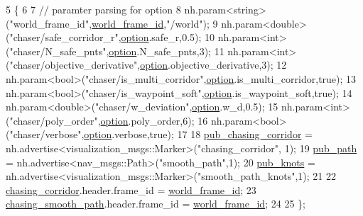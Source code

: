 \begin{DoxyCode}
5                                         \{
6 
7     \textcolor{comment}{// paramter parsing for option }
8     nh.param<\textcolor{keywordtype}{string}>(\textcolor{stringliteral}{"world\_frame\_id"},\hyperlink{class_smooth_planner_ade278c4209b962d8342a2ee30e718c8b}{world\_frame\_id},\textcolor{stringliteral}{"/world"});
9     nh.param<\textcolor{keywordtype}{double}>(\textcolor{stringliteral}{"chaser/safe\_corridor\_r"},\hyperlink{class_smooth_planner_af0c954aea3c6b5b82a160ed4be93fb17}{option}.safe\_r,0.5);
10     nh.param<\textcolor{keywordtype}{int}>(\textcolor{stringliteral}{"chaser/N\_safe\_pnts"},\hyperlink{class_smooth_planner_af0c954aea3c6b5b82a160ed4be93fb17}{option}.N\_safe\_pnts,3);
11     nh.param<\textcolor{keywordtype}{int}>(\textcolor{stringliteral}{"chaser/objective\_derivative"},\hyperlink{class_smooth_planner_af0c954aea3c6b5b82a160ed4be93fb17}{option}.objective\_derivative,3);
12     nh.param<\textcolor{keywordtype}{bool}>(\textcolor{stringliteral}{"chaser/is\_multi\_corridor"},\hyperlink{class_smooth_planner_af0c954aea3c6b5b82a160ed4be93fb17}{option}.is\_multi\_corridor,\textcolor{keyword}{true});
13     nh.param<\textcolor{keywordtype}{bool}>(\textcolor{stringliteral}{"chaser/is\_waypoint\_soft"},\hyperlink{class_smooth_planner_af0c954aea3c6b5b82a160ed4be93fb17}{option}.is\_waypoint\_soft,\textcolor{keyword}{true});
14     nh.param<\textcolor{keywordtype}{double}>(\textcolor{stringliteral}{"chaser/w\_deviation"},\hyperlink{class_smooth_planner_af0c954aea3c6b5b82a160ed4be93fb17}{option}.w\_d,0.5);
15     nh.param<\textcolor{keywordtype}{int}>(\textcolor{stringliteral}{"chaser/poly\_order"},\hyperlink{class_smooth_planner_af0c954aea3c6b5b82a160ed4be93fb17}{option}.poly\_order,6);
16     nh.param<\textcolor{keywordtype}{bool}>(\textcolor{stringliteral}{"chaser/verbose"},\hyperlink{class_smooth_planner_af0c954aea3c6b5b82a160ed4be93fb17}{option}.verbose,\textcolor{keyword}{true});
17 
18     \hyperlink{class_smooth_planner_a7cd9de34963f445a21a6d0101346b071}{pub\_chasing\_corridor} = nh.advertise<visualization\_msgs::Marker>(\textcolor{stringliteral}{"chasing\_corridor"},
      1); 
19     \hyperlink{class_smooth_planner_a7b8400f711456291e567d0fc204c274b}{pub\_path} = nh.advertise<nav\_msgs::Path>(\textcolor{stringliteral}{"smooth\_path"},1);
20     \hyperlink{class_smooth_planner_a7ee67bceac6d60409542a2250b2ccd08}{pub\_knots} = nh.advertise<visualization\_msgs::Marker>(\textcolor{stringliteral}{"smooth\_path\_knots"},1);
21 
22     \hyperlink{class_smooth_planner_addf7aab458c1407f23e3544bd76ac82b}{chasing\_corridor}.header.frame\_id = \hyperlink{class_smooth_planner_ade278c4209b962d8342a2ee30e718c8b}{world\_frame\_id};
23     \hyperlink{class_smooth_planner_a6a33038c6041ff972bea7765780b56d0}{chasing\_smooth\_path}.header.frame\_id = \hyperlink{class_smooth_planner_ade278c4209b962d8342a2ee30e718c8b}{world\_frame\_id};
24 
25 \};
\end{DoxyCode}
